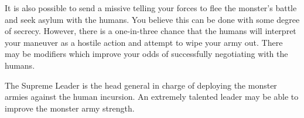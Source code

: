 \documentclass[green]{guildcamp2}
\begin{document}
It is also possible to send a missive telling your forces to flee the monster's battle and seek asylum with the humans. You believe this can be done with some degree of secrecy. However, there is a one-in-three chance that the humans will interpret your maneuver as a hostile action and attempt to wipe your army out. There may be modifiers which improve your odds of successfully negotiating with the humans.

The Supreme Leader is the head general in charge of deploying the monster armies against the human incursion. An extremely talented leader may be able to improve the monster army strength.
\end{document}
